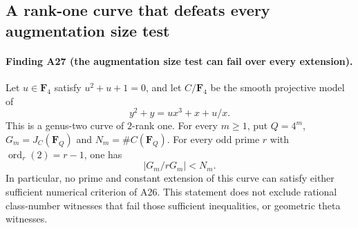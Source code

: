 \subsection{A rank-one curve that defeats every augmentation size test}
\label{sec:rank-one-augmentation-obstruction}

\paragraph{Finding A27 (the augmentation size test can fail over every extension).}
Let $u\in\mathbf F_4$ satisfy $u^2+u+1=0$, and let
$C/\mathbf F_4$ be the smooth projective model of
\[
                    y^2+y=ux^3+x+u/x.
\tag{RO.1}
\]
This is a genus-two curve of $2$-rank one.
For every $m\ge1$, put $Q=4^m$, $G_m=J_C(\mathbf F_Q)$
and $N_m=\#C(\mathbf F_Q)$.
For every odd prime $r$ with $\operatorname{ord}_r(2)=r-1$,
one has
\[
                         |G_m/rG_m|<N_m.
\tag{RO.2}
\]
In particular, no prime and constant extension of this
curve can satisfy either sufficient numerical criterion
of A26.  This statement does not exclude rational
class-number witnesses that fail those sufficient
inequalities, or geometric theta witnesses.

